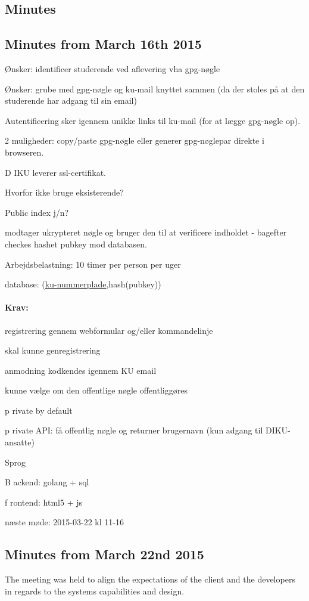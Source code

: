 \documentclass[11pt,a4paper]{report}
\let\OldItem\item
\newcommand{\SubItemStart}[1]{%
    \let\item\SubItemEnd
    \begin{SubItemList}[resume]%
        \OldItem #1%
}
\newcommand{\SubItemMiddle}[1]{%
    \OldItem #1%
}
\newcommand{\SubItemEnd}[1]{%
    \end{SubItemList}%
    \let\item\OldItem
    \item #1%
}
\newcommand*{\SubItem}[1]{%
    \let\SubItem\SubItemMiddle%
    \SubItemStart{#1}%
}%
\begin{document}
\begin{appendices}
\chapter{Minutes}
\section{Minutes from March 16th 2015}
\begin{itemize}
\item Ønsker: identificer studerende ved aflevering vha gpg-nøgle
\item Ønsker: grube med gpg-nøgle og ku-mail knyttet sammen (da der stoles på at den studerende har adgang til sin email)
\item Autentificering sker igennem unikke links til ku-mail (for at lægge gpg-nøgle op).
\SubItem 2 muligheder: copy/paste gpg-nøgle eller generer gpg-nøglepar direkte i browseren.
\item DIKU leverer ssl-certifikat.
\item Hvorfor ikke bruge eksisterende?
\item Public index j/n?
\item modtager ukrypteret nøgle og bruger den til at verificere indholdet - bagefter checkes hashet pubkey mod databasen.
\item Arbejdsbelastning: 10 timer per person per uger
\item database: (\underline{ku-nummerplade},hash(pubkey))
\end{itemize}
\subsubsection{Krav:}
\begin{itemize}
\item registrering gennem webformular og/eller kommandelinje
\item skal kunne genregistrering
\item anmodning kodkendes igennem KU email
\item kunne vælge om den offentlige nøgle offentliggøres
\SubItem private by default
\item private API: få offentlig nøgle og returner brugernavn (kun adgang til DIKU-ansatte)
\item Sprog
\SubItem Backend: golang + sql
\SubItem frontend: html5 + js
\end{itemize}

næste møde:
2015-03-22 kl 11-16

\section{Minutes from March 22nd 2015}
The meeting was held to align the expectations of the client and the developers in regards to the systems capabilities and design.


\end{appendices}
\end{document}
